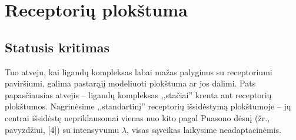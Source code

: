 \documentclass[10pt]{article}
\begin{document}
\section{Receptorių plokštuma}
\subsection{Statusis kritimas}
Tuo atveju, kai ligandų kompleksas labai mažas palyginus su 
receptoriumi paviršiumi, galima pastarąjį modeliuoti plokštuma ar jos dalimi. Pats papasčiausias atvejis -- ligandų kompleksas ,,stačiai'' krenta ant receptorių plokštumos. Nagrinėsime ,,standartinį''  receptorių išsidėstymą plokštumoje -- jų centrai išsidėstę nepriklausomai vienas nuo kito pagal Puasono dėsnį (žr., pavyzdžiui, [4]) su intensyvumu $\lambda$, visas sąveikas laikysime neadaptacinėmis. 


\end{document}
